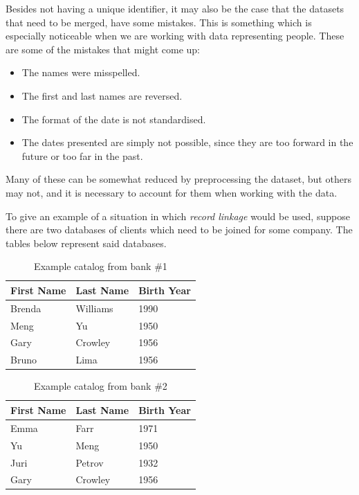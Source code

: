 \documentclass[epsfig,a4paper,11pt,titlepage,twoside,openany]{book}
\begin{document}
Besides not having a unique identifier, it may also be the case that the datasets that need to be merged, have some mistakes. This is something which is especially noticeable when we are working with data representing people. These are some of the mistakes that might come up: 

\begin{itemize}
\item The names were misspelled.
\item The first and last names are reversed.
\item The format of the date is not standardised.
\item The dates presented are simply not possible, since they are too forward in the future or too far in the past.
\end{itemize}

Many of these can be somewhat reduced by preprocessing the dataset, but others may not, and it is necessary to account for them when working with the data.

To give an example of a situation in which \textit{record linkage} would be used,
suppose there are two databases of clients which need to be joined for some company. The tables below represent said databases.

\begin{table}[H]
  \centering{}
  \begin{tabular}{l|l|l}
    First Name & Last Name  & Birth Year \\ \hline
    Brenda     & Williams   & 1990       \\
    Meng        & Yu         & 1950       \\
    Gary        & Crowley   &  1956 \\
    Bruno      & Lima       & 1956      
  \end{tabular}
  \caption{Example catalog from bank \#1}
  \label{tab:ex-catalog-1}
\end{table}


\begin{table}[H]
  \centering{}
  \begin{tabular}{l|l|l}
    First Name & Last Name  & Birth Year \\ \hline
    Emma       & Farr       & 1971       \\
    Yu         & Meng       & 1950       \\
    Juri       &  Petrov    & 1932 \\
    Gary       & Crowley    & 1956      
  \end{tabular}
  \caption{Example catalog from bank \#2}
  \label{tab:ex-catalog-2}
\end{table}
\end{document}
